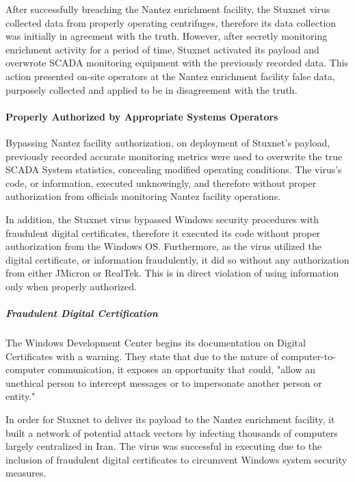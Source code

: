 \documentclass[12pt]{article}
\begin{document}
\begin{multicols}{2}
After successfully breaching the Nantez enrichment facility, the Stuxnet virus collected data from properly operating centrifuges, therefore its data collection was initially in agreement with the truth. However, after secretly monitoring enrichment activity for a period of time, Stuxnet activated its payload and overwrote SCADA monitoring equipment with the previously recorded data.\cite{toKillACentrifuge} This action presented on-site operators at the Nantez enrichment facility false data, purposely collected and applied to be in disagreement with the truth.

\paragraph{Properly Authorized by Appropriate Systems Operators}

Bypassing Nantez facility authorization, on deployment of Stuxnet's payload, previously recorded accurate monitoring metrics were used to overwrite the true SCADA System statistics, concealing modified operating conditions.\cite{theRealStoryOfStuxnet} The virus's code, or information, executed unknowingly, and therefore without proper authorization from officials monitoring Nantez facility operations.

In addition, the Stuxnet virus bypassed Windows security procedures with fraudulent digital certificates, therefore it executed its code without proper authorization from the Windows OS. Furthermore, as the virus utilized the digital certificate, or information fraudulently, it did so without any authorization from either JMicron or RealTek.\cite{signedUsingCertificates} This is in direct violation of using information only when properly authorized.

\subparagraph{Fraudulent Digital Certification}

The Windows Development Center begins its documentation on Digital Certificates with a warning. They state that due to the nature of computer-to-computer communication, it exposes an opportunity that could, "allow an unethical person to intercept messages or to impersonate another person or entity."\cite{moreOnDigitalCertificates}

In order for Stuxnet to deliver its payload to the Nantez enrichment facility, it built a network of potential attack vectors by infecting thousands of computers largely centralized in Iran.\cite{lessonsFromStuxnet} The virus was successful in executing due to the inclusion of fraudulent digital certificates to circumvent Windows system security measures.


\end{multicols}
\end{document}
